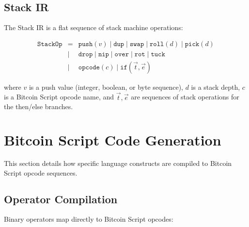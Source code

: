 \documentclass[11pt,a4paper]{article}
\begin{document}
\subsection{Stack IR}
\label{sec:ir-stack}

The Stack IR is a flat sequence of stack machine operations:

\[
\begin{array}{rcl}
\texttt{StackOp} &=& \texttt{push}(v) \mid \texttt{dup} \mid \texttt{swap} \mid \texttt{roll}(d) \mid \texttt{pick}(d) \\
  &\mid& \texttt{drop} \mid \texttt{nip} \mid \texttt{over} \mid \texttt{rot} \mid \texttt{tuck} \\
  &\mid& \texttt{opcode}(c) \mid \texttt{if}(\vec{t}, \vec{e})
\end{array}
\]

where $v$ is a push value (integer, boolean, or byte sequence), $d$ is a
stack depth, $c$ is a Bitcoin Script opcode name, and $\vec{t}, \vec{e}$
are sequences of stack operations for the then/else branches.

\section{Bitcoin Script Code Generation}
\label{sec:codegen}

This section details how specific language constructs are compiled to
Bitcoin Script opcode sequences.

\subsection{Operator Compilation}
\label{sec:codegen-ops}

Binary operators map directly to Bitcoin Script opcodes:
\end{document}
